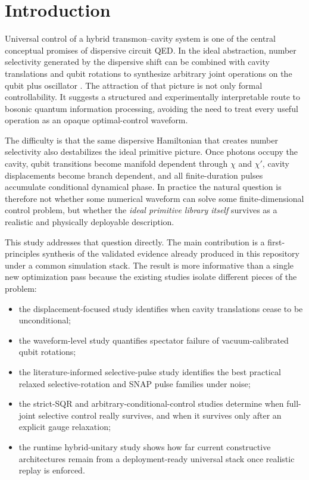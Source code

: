 \documentclass[11pt]{article}
\begin{document}
\section{Introduction}

Universal control of a hybrid transmon--cavity system is one of the central conceptual promises of dispersive circuit QED. In the ideal abstraction, number selectivity generated by the dispersive shift can be combined with cavity translations and qubit rotations to synthesize arbitrary joint operations on the qubit plus oscillator \cite{koch2007transmon,blais2021circuit,krastanov2015universal}. The attraction of that picture is not only formal controllability. It suggests a structured and experimentally interpretable route to bosonic quantum information processing, avoiding the need to treat every useful operation as an opaque optimal-control waveform.

The difficulty is that the same dispersive Hamiltonian that creates number selectivity also destabilizes the ideal primitive picture. Once photons occupy the cavity, qubit transitions become manifold dependent through $\chi$ and $\chi'$, cavity displacements become branch dependent, and all finite-duration pulses accumulate conditional dynamical phase. In practice the natural question is therefore not whether some numerical waveform can solve some finite-dimensional control problem, but whether the \emph{ideal primitive library itself} survives as a realistic and physically deployable description.

This study addresses that question directly. The main contribution is a first-principles synthesis of the validated evidence already produced in this repository under a common simulation stack. The result is more informative than a single new optimization pass because the existing studies isolate different pieces of the problem:
\begin{itemize}
\item the displacement-focused study identifies when cavity translations cease to be unconditional;
\item the waveform-level study quantifies spectator failure of vacuum-calibrated qubit rotations;
\item the literature-informed selective-pulse study identifies the best practical relaxed selective-rotation and SNAP pulse families under noise;
\item the strict-SQR and arbitrary-conditional-control studies determine when full-joint selective control really survives, and when it survives only after an explicit gauge relaxation;
\item the runtime hybrid-unitary study shows how far current constructive architectures remain from a deployment-ready universal stack once realistic replay is enforced.
\end{itemize}
\end{document}
